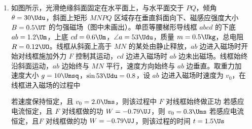 \begin{enumerate}
\begin{figure}[htbp]
\centering

\end{figure}
{保持 $ v $、$ x $、$ h $ 不变，增大 $ \theta $，排球一定不会出界}
{保持 $ \theta $ 不变，增大 $ x $ 同时减小 $ h $，排球不下网就一定出界}
{保持 $ x $、$ h $ 不变，同时增大 $ v $ 和 $ \theta $，排球从被击出到落地所需时间可能不变}


\item
如图所示，光滑绝缘斜面固定在水平面上，与水平面交于 $ PQ $，倾角 $ \theta =30 \Udu $，斜面上矩形 $ MNPQ $ 区域存在垂直斜面向下、磁感应强度大小 $ B =0.5\UT $ 的匀强磁场（图中未画出）。单匝等腰梯形导线框 $ abcd $ 的下底 $ ab=1.2 \Um $，上底 $ cd=0.6 \Um $，$ \angle a=53 \Udu $，质量 $ m =0.5 \Ukg $，总电阻 $ R =0.12 \UO $。线框从斜面上高于 $ MN $ 的某处由静止释放，$ ab $ 边进入磁场时开始对线框施加外力 $ F $ 控制其运动，$ cd $ 边进入磁场时 $ ab $ 边未出磁场。线框始终沿斜面运动，$ ab $ 边始终与 $ MN $ 平行，速度方向始终与 $ ab $ 边垂直。取重力加速度大小 $ g =10 \Umsq $，$ \sin 53 \Udu =0.8 $，设 $ ab $ 边进入磁场时速度为 $ v_{0} $，在线框进入磁场的过程中 \xzanswer{}
\begin{figure}[htbp]
	\centering
	
\end{figure}

{若速度保持恒定，且 $ v_{0} =2.0 \Ums $，则该过程中 $ F $ 对线框始终做正功}
{若感应电流恒定，且 $ F $ 对线框做的功 $ W = - 0.79 \UJ $，则 $ v_{0} =0.3 \Ums $}
{若感应电流恒定，且$ F $ 对线框做的功 $ W = - 0.79 \UJ $，则该过程的时间 $ t =1.5 \Us $}



\end{enumerate}
